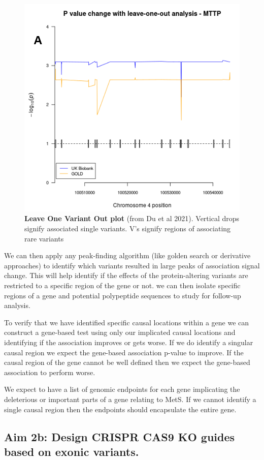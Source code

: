 \documentclass[11pt]{article}
\begin{document}
\begin{figure}[h]
  \includegraphics[width=0.7\linewidth]{"images/fig2.png"} 
  \caption{\textbf{Leave One Variant Out plot} (from Du et al 2021). Vertical drops signify associated single variants. V's signify regions of associating rare variants}
  \label{fig:f2}
\end{figure}
  

We can then apply any peak-finding algorithm (like golden search or derivative approaches) to identify which variants resulted in large peaks of association signal change. This will help identify if the effects of the protein-altering variants are restricted to a specific region of the gene or not. we can then isolate specific regions of a gene and potential polypeptide sequences to study for follow-up analysis.

To verify that we have identified specific causal locations within a gene we can construct a gene-based test using only our implicated causal locations and identifying if the association improves or gets worse. If we do identify a singular causal region we expect the gene-based association p-value to improve. If the causal region of the gene cannot be well defined then we expect the gene-based association to perform worse.

We expect to have a list of genomic endpoints for each gene implicating the deleterious or important parts of a gene relating to MetS. If we cannot identify a single causal region then the endpoints should encapsulate the entire gene.

\subsection*{Aim 2b: Design CRISPR CAS9 KO guides based on exonic variants.} 
\end{document}

